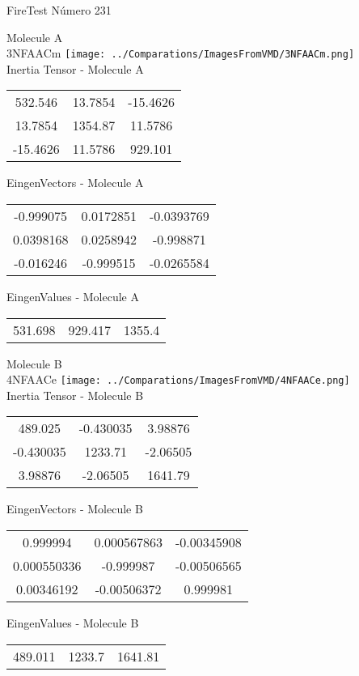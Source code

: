 \vtab[-2cm]
\begin{center}
{\large FireTest \tab Número 231}
\end{center}
\begin{multicols}{2}
\begin{center}

Molecule A \\ 
3NFAACm
\texttt{[image: ../Comparations/ImagesFromVMD/3NFAACm.png]}
\\
Inertia Tensor - Molecule A \\
\vtab

\begin{tabular}{|c c c|}
532.546	 & 	13.7854	 & 	-15.4626	 \\
13.7854	 & 	1354.87	 & 	11.5786	 \\
-15.4626	 & 	11.5786	 & 	929.101
\end{tabular}

\vtab
 EingenVectors - Molecule A     \\
\vtab
\begin{tabular}{|c c c|}
-0.999075	 & 	0.0172851	 & 	-0.0393769	 \\
0.0398168	 & 	0.0258942	 & 	-0.998871	 \\
-0.016246	 & 	-0.999515	 & 	-0.0265584
\end{tabular}

\vtab
 EingenValues - Molecule A     \\
\vtab
\begin{tabular}{|c c c|}
531.698	 & 	929.417	 & 	1355.4	 \\
\end{tabular}
\columnbreak

Molecule B \\ 
4NFAACe
\texttt{[image: ../Comparations/ImagesFromVMD/4NFAACe.png]}
\\
Inertia Tensor - Molecule B \\
\vtab

\begin{tabular}{|c c c|}
489.025	 & 	-0.430035	 & 	3.98876	 \\
-0.430035	 & 	1233.71	 & 	-2.06505	 \\
3.98876	 & 	-2.06505	 & 	1641.79
\end{tabular}

\vtab
 EingenVectors - Molecule B     \\
\vtab
\begin{tabular}{|c c c|}
0.999994	 & 	0.000567863	 & 	-0.00345908	 \\
0.000550336	 & 	-0.999987	 & 	-0.00506565	 \\
0.00346192	 & 	-0.00506372	 & 	0.999981
\end{tabular}

\vtab
 EingenValues - Molecule B     \\
\vtab
\begin{tabular}{|c c c|}
489.011	 & 	1233.7	 & 	1641.81	 \\
\end{tabular}

\end{center}
\end{multicols}

